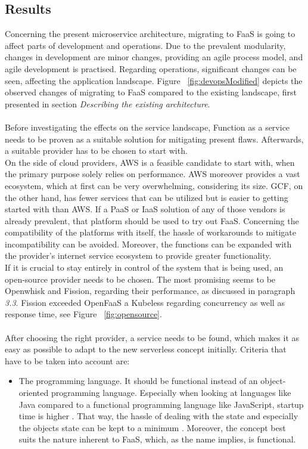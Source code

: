 \documentclass[a4paper,twoside,11pt, pagesize]{scrartcl}
\begin{document}
\begin{spacing}{1.2}
\subsection{Results}
Concerning the present microservice architecture, migrating to FaaS is going to affect parts of development and operations. Due to the prevalent modularity, changes in development are minor changes, providing an agile process model, and agile development is practised. Regarding operations, significant changes can be seen, affecting the application landscape. Figure ~\ref{fig:devopsModified} depicts the observed changes of migrating to FaaS compared to the existing landscape, first presented in section \textit{Describing the existing architecture}.\\\\ Before investigating the effects on the service landscape, Function as a service needs to be proven as a suitable solution for mitigating present flaws. Afterwards, a suitable provider has to be chosen to start with.\\On the side of cloud providers, AWS is a feasible candidate to start with, when the primary purpose solely relies on performance. AWS moreover provides a vast ecosystem, which at first can be very overwhelming, considering its size. GCF, on the other hand, has fewer services that can be utilized but is easier to getting started with than AWS. If a PaaS or IaaS solution of any of those vendors is already prevalent, that platform should be used to try out FaaS. Concerning the compatibility of the platforms with itself, the hassle of workarounds to mitigate incompatibility can be avoided. Moreover, the functions can be expanded with the provider's internet service ecosystem to provide greater functionality.\\If it is crucial to stay entirely in control of the system that is being used, an open-source provider needs to be chosen. The most promising seems to be Openwhisk and Fission, regarding their performance, as discussed in paragraph \textit{3.3}. Fission exceeded OpenFaaS a Kubeless regarding concurrency as well as response time, see Figure ~\ref{fig:opensource}.\\\\ After choosing the right provider, a service needs to be found, which makes it as easy as possible to adapt to the new serverless concept initially. Criteria that have to be taken into account are:
\begin{itemize}
  \item[1.] The programming language. It should be functional instead of an object-oriented programming language. Especially when looking at languages like Java compared to a functional programming language like JavaScript, startup time is higher \cite{manner2018cold}. That way, the hassle of dealing with the state and especially the objects state can be kept to a minimum \cite{bardsley2018serverless}. Moreover, the concept best suits the nature inherent to FaaS, which, as the name implies, is functional.

\end{itemize}
\end{spacing}
\end{document}
